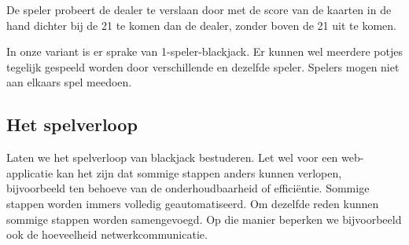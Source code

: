 De speler probeert de dealer te verslaan door met de score van de kaarten 
in de hand dichter bij de 21 te komen dan de dealer, 
zonder boven de 21 uit te komen.

In onze variant is er sprake van 1-speler-blackjack. Er kunnen wel 
meerdere potjes tegelijk gespeeld worden door verschillende en dezelfde 
speler. Spelers mogen niet aan elkaars spel meedoen.

\subsection{Het spelverloop}
Laten we het spelverloop van blackjack bestuderen.
Let wel\: voor een web-applicatie kan het zijn dat sommige stappen
anders kunnen verlopen, bijvoorbeeld ten behoeve van de onderhoudbaarheid
of efficiëntie. Sommige stappen worden immers volledig geautomatiseerd. 
Om dezelfde reden kunnen sommige stappen worden samengevoegd. 
Op die manier beperken we bijvoorbeeld ook de hoeveelheid netwerkcommunicatie.

